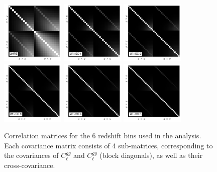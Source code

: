 \documentclass[useAMS,usenatbib]{mn2e}
\begin{document}
  \begin{figure}
    \centering
    \includegraphics[width=0.27\textwidth]{cov_2mpz.pdf}
    \includegraphics[width=0.27\textwidth]{cov_wisc1.pdf}
    \includegraphics[width=0.27\textwidth]{cov_wisc2.pdf}
    \includegraphics[width=0.27\textwidth]{cov_wisc3.pdf}
    \includegraphics[width=0.27\textwidth]{cov_wisc4.pdf}
    \includegraphics[width=0.27\textwidth]{cov_wisc5.pdf}
    \caption{Correlation matrices for the 6 redshift bins used in the analysis. Each covariance matrix consists of 4 sub-matrices, corresponding to the covariances of $C^{gg}_\ell$ and $C^{gy}_\ell$ (block diagonals), as well as their cross-covariance.}
    \label{fig:covs}
  \end{figure}
\end{document}

